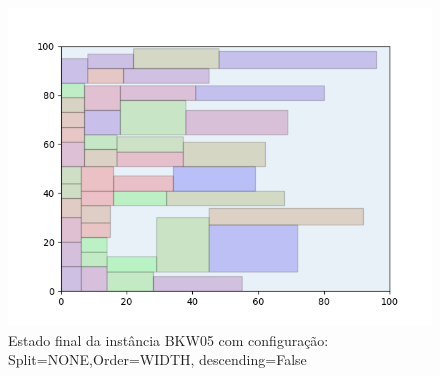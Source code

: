 \begin{figure}[H]
    \centering
    \caption[]{Estado final da instância BKW05 com configuração: Split=NONE,Order=WIDTH, descending=False}
    \label{fig:bkw05-none-width-false}
    \includegraphics[scale=0.5]{output/figures/bkw/bkw05/none/width/false/00}
\end{figure}